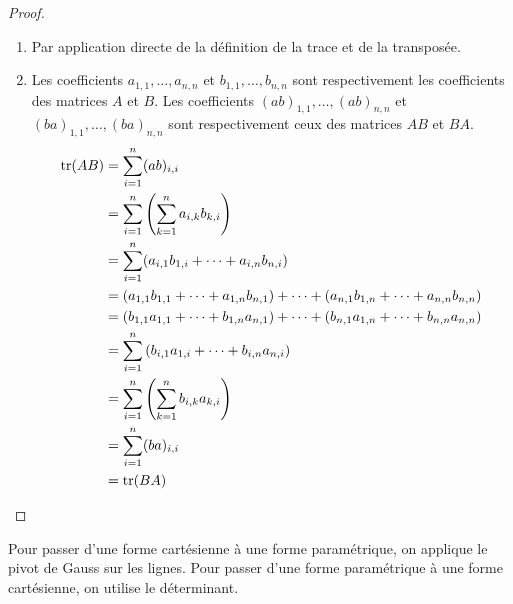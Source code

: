 \begin{proof}
	\leavevmode
    \begin{enumerate}
        \item Par application directe de la définition de la trace et de la transposée.
        \item Les coefficients $a_{1,1}, \ldots, a_{n,n}$ et $b_{1,1}, \ldots, b_{n,n}$ sont respectivement les coefficients des matrices $A$ et $B$. Les coefficients $(ab)_{1,1}, \ldots, (ab)_{n,n}$ et $(ba)_{1,1}, \ldots, (ba)_{n,n}$ sont respectivement ceux des matrices $AB$ et $BA$.
        \begin{align*}
        	\tr(AB) &= \sum_{i=1}^n (ab)_{i,i} \\
        			&= \sum_{i=1}^n \left( \sum_{k=1}^n a_{i,k} b_{k,i} \right) \\
        			&= \sum_{i=1}^n (a_{i,1} b_{1,i} + \cdots + a_{i,n} b_{n,i}) \\
        			&= (a_{1,1} b_{1,1} + \cdots + a_{1,n} b_{n,1}) + \cdots + (a_{n,1} b_{1,n} + \cdots + a_{n,n} b_{n,n}) \\
        			&= (b_{1,1}a_{1,1} + \cdots + b_{1,n}a_{n,1}) + \cdots + (b_{n,1} a_{1,n} + \cdots + b_{n,n} a_{n,n}) \\
        			&= \sum_{i=1}^n \left( b_{i,1} a_{1,i} + \cdots + b_{i,n} a_{n,i} \right) \\
        			&= \sum_{i=1}^n \left( \sum_{k=1}^n b_{i,k} a_{k,i} \right) \\
        			&= \sum_{i=1}^n (ba)_{i,i} \\
        			&= \tr(BA)
        \end{align*}
    \end{enumerate}
\end{proof}

\begin{proposition}
    Pour passer d'une forme cartésienne à une forme paramétrique, on applique le pivot de Gauss sur les lignes.
    Pour passer d'une forme paramétrique à une forme cartésienne, on utilise le déterminant.
\end{proposition}
